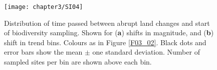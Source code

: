 \begin{figure}[h]
\centering
\texttt{[image: chapter3/SI04]}
\caption{ Distribution of time passed between abrupt land changes and start of biodiversity sampling. Shown for (\textbf{a}) shifts in magnitude, and (\textbf{b}) shift in trend bins. Colours as in Figure \ref{F03_02}. Black dots and error bars show the mean $\pm$ one standard deviation. Number of sampled sites per bin are shown above each bin.}
\label{SI03_04}
\end{figure}


